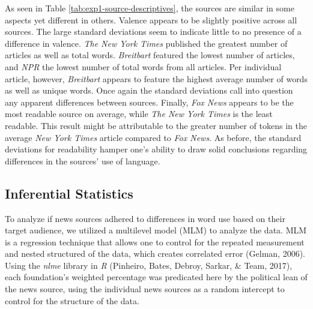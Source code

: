 \documentclass[english,,man]{apa6}
\begin{document}
As seen in Table \ref{tab:exp1-source-descriptives}, the sources are
similar in some aspects yet different in others. Valence appears to be
slightly positive across all sources. The large standard deviations seem
to indicate little to no presence of a difference in valence. \emph{The
New York Times} published the greatest number of articles as well as
total words. \emph{Breitbart} featured the lowest number of articles,
and \emph{NPR} the lowest number of total words from all articles. Per
individual article, however, \emph{Breitbart} appears to feature the
highest average number of words as well as unique words. Once again the
standard deviations call into question any apparent differences between
sources. Finally, \emph{Fox News} appears to be the most readable source
on average, while \emph{The New York Times} is the least readable. This
result might be attributable to the greater number of tokens in the
average \emph{New York Times} article compared to \emph{Fox News}. As
before, the standard deviations for readability hamper one's ability to
draw solid conclusions regarding differences in the sources' use of
language.

\subsection{Inferential Statistics}\label{inferential-statistics}

To analyze if news sources adhered to differences in word use based on
their target audience, we utilized a multilevel model (MLM) to analyze
the data. MLM is a regression technique that allows one to control for
the repeated measurement and nested structured of the data, which
creates correlated error (Gelman, 2006). Using the \emph{nlme} library
in \emph{R} (Pinheiro, Bates, Debroy, Sarkar, \& Team, 2017), each
foundation's weighted percentage was predicated here by the political
lean of the news source, using the individual news sources as a random
intercept to control for the structure of the data.
\end{document}
